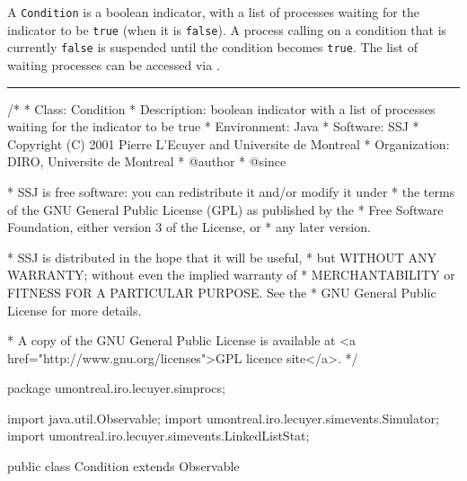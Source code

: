 
A \texttt{Condition} is a boolean indicator, with a list of processes  
waiting for the indicator to be \texttt{true} (when it is \texttt{false}).
A process calling  on a condition that is currently
\texttt{false} is suspended until the condition becomes \texttt{true}.
The list of waiting processes can be accessed via .

\bigskip\hrule

\begin{code}
\begin{hide}
/*
 * Class:        Condition
 * Description:  boolean indicator with a list of processes waiting for 
                 the indicator to be true
 * Environment:  Java
 * Software:     SSJ 
 * Copyright (C) 2001  Pierre L'Ecuyer and Universite de Montreal
 * Organization: DIRO, Universite de Montreal
 * @author       
 * @since

 * SSJ is free software: you can redistribute it and/or modify it under
 * the terms of the GNU General Public License (GPL) as published by the
 * Free Software Foundation, either version 3 of the License, or
 * any later version.

 * SSJ is distributed in the hope that it will be useful,
 * but WITHOUT ANY WARRANTY; without even the implied warranty of
 * MERCHANTABILITY or FITNESS FOR A PARTICULAR PURPOSE.  See the
 * GNU General Public License for more details.

 * A copy of the GNU General Public License is available at
   <a href="http://www.gnu.org/licenses">GPL licence site</a>.
 */
\end{hide}
package umontreal.iro.lecuyer.simprocs;\begin{hide}
import java.util.Observable;
import umontreal.iro.lecuyer.simevents.Simulator;
import umontreal.iro.lecuyer.simevents.LinkedListStat;\end{hide}

public class Condition extends Observable \begin{hide} {

   private String name;
   private LinkedListStat<UserRecord> waitingList;
   private boolean state;
   private boolean broadcasting;
   private ProcessSimulator sim;
\end{hide}\end{code}

